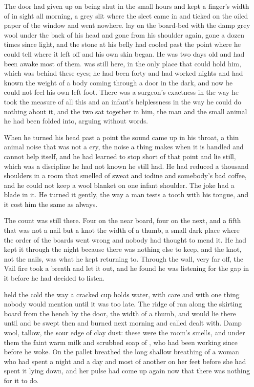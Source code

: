 The door had given up on being shut in the small hours and kept a finger's width of  in sight all morning, a grey slit where the sleet came in and ticked on the oiled paper of the window and went nowhere.  lay on the board-bed with the damp grey wool under the back of his head and gone from his shoulder again, gone a dozen times since light, and the stone at his belly had cooled past the point where he could tell where it left off and his own skin began. He was two days old and had been awake most of them.  was still here, in the only place that could hold him, which was behind these eyes; he had been forty and had worked nights and had known the weight of a body coming through a door in the dark, and now he could not feel his own left foot. There was a surgeon's exactness in the way he took the measure of all this and an infant's helplessness in the way he could do nothing about it, and the two sat together in him, the man and the small animal he had been folded into, arguing without words.

When he turned his head past a point the sound came up in his throat, a thin animal noise that was not a cry, the noise a thing makes when it is handled and cannot help itself, and he had learned to stop short of that point and lie still, which was a discipline he had not known he still had. He had reduced a thousand shoulders in a room that smelled of sweat and iodine and somebody's bad coffee, and he could not keep a wool blanket on one infant shoulder. The joke had a blade in it. He turned it gently, the way a man tests a tooth with his tongue, and it cost him the same as always.

The count was still there. Four on the near board, four on the next, and a fifth that was not a nail but a knot the width of a thumb, a small dark place where the order of the boards went wrong and nobody had thought to mend it. He had kept it through the night because there was nothing else to keep, and the knot, not the nails, was what he kept returning to. Through the wall, very far off, the Vail fire took a breath and let it out, and he found he was listening for the gap in it before he had decided to listen.

 held the cold the way a cracked cup holds water, with care and with one thing nobody would mention until it was too late. The ridge of  ran along the skirting board from the bench by the door, the width of a thumb, and would lie there until  and be swept then and burned next morning and called dealt with. Damp wool, tallow, the sour edge of clay dust: these were the room's smells, and under them the faint warm milk and scrubbed soap of , who had been working since before he woke. On the pallet  breathed the long shallow breathing of a woman who had spent a night and a day and most of another on her feet before she had spent it lying down, and her pulse had come up again now that there was nothing for it to do.

